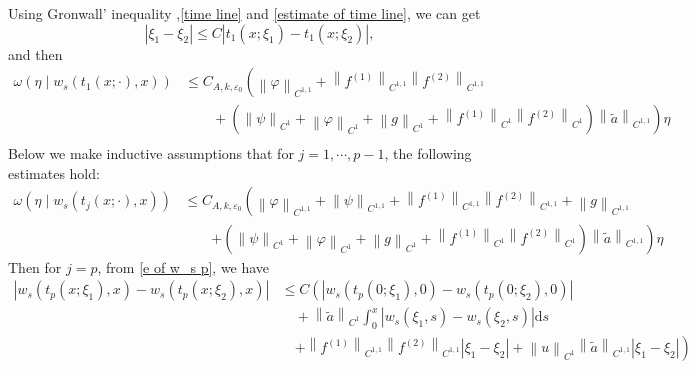 \documentclass[a4paper,reqno,11pt]{amsart}
\numberwithin{equation}{section} %
\begin{document}
Using Gronwall' inequality ,\eqref{time line} and \eqref{estimate of time line}, we can get
$$
\left| \xi _1-\xi _2 \right|\leq C\left| t_1\left( x;\xi _1 \right) -t_1\left( x;\xi _2 \right) \right|,
$$
and then
$$
\begin{aligned}
\omega \left( \eta \mid w_s\left( t_1\left( x;\cdot \right) ,x \right) \right) & \leq C_{A,k,\varepsilon _0}\left( \left\| \varphi \right\| _{C^{1,1}} +\left\| f^{(1)} \right\| _{C^{1,1}}\left\| f^{(2)} \right\| _{C^{1,1}} \right.\\
  &\qquad  +\left. (\left\| \psi \right\| _{C^1}+\left\| \varphi \right\| _{C^1}+\left\| g \right\| _{C^1}+\left\| f^{(1)} \right\| _{C^1}\left\| f^{(2)} \right\| _{C^1})\left\| \tilde{a} \right\| _{C^{1,1}} \right) \eta \\
\end{aligned}
$$
Below we make inductive assumptions that for $j=1,\cdots,p-1$, the following estimates hold:
\begin{equation}\label{inductive assumption for w eta}
\begin{aligned}
\omega \left( \eta \mid w_s\left( t_j\left( x;\cdot \right) ,x \right) \right) &\leq  C_{A,k,\varepsilon _0}\left( \left\| \varphi \right\| _{C^{1,1}}+\left\| \psi \right\| _{C^{1,1}}+\left\| f^{(1)} \right\| _{C^{1,1}}\left\| f^{(2)} \right\| _{C^{1,1}}+\left\| g \right\| _{C^{1,1}}\right. \\
& \qquad \left.+(\left\| \psi \right\| _{C^1}+\left\| \varphi \right\| _{C^1}+\left\| g \right\| _{C^1}+\left\| f^{(1)} \right\| _{C^1}\left\| f^{(2)} \right\| _{C^1})\left\| \tilde{a} \right\| _{C^{1,1}} \right) \eta 
\end{aligned}
\end{equation}
Then for $j=p$, from \eqref{e of w_s p}, we have
$$
\begin{aligned}
	\left| w_s\left( t_p\left( x;\xi _1 \right) ,x \right) -w_s\left( t_p\left( x;\xi _2 \right) ,x \right) \right|&\le C\left( \left| w_s\left( t_p\left( 0;\xi _1 \right) ,0 \right) -w_s\left( t_p\left( 0;\xi _2 \right) ,0 \right) \right| \right.\\
	&\quad  +\left\| \tilde{a} \right\| _{C^1}\int_0^x{\left| w_s\left( \xi _1,s \right) -w_s\left( \xi _2,s \right) \right|\mathrm{d}s}\\
	&\quad \left.  +\left\| f^{\left( 1 \right)} \right\| _{C^{1,1}}\left\| f^{\left( 2 \right)} \right\| _{C^{1,1}}\left| \xi _1-\xi _2 \right|+\left\| u \right\| _{C^1}\left\| \tilde{a} \right\| _{C^{1,1}}\left| \xi _1-\xi _2 \right| \right)\\
\end{aligned}
$$
\end{document}
